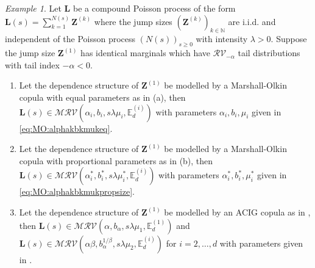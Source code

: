 \documentclass[aos]{imsart}
\numberwithin{equation}{section}
\theoremstyle{plain} %
\theoremstyle{remark}
\newtheorem{example}[theorem]{Example}
\newcommand{\E}{\mathbb{E}}
\newcommand{\N}{\mathbb{N}}
\def\MRV{\mathcal{MRV}}
\def\RV{\mathcal{RV}}
\def\bZ{\boldsymbol Z}
\def\bL{\boldsymbol L}
\begin{document}
\begin{example} \label{Example:5.2}
Let $\bL$ be a  compound Poisson process of the form $\bL(s)=\sum_{k=1}^{N(s)}\bZ^{(k)}$ where the jump sizes $(\bZ^{(k)})_{k\in\N}$ are i.i.d. and independent of the Poisson process $(N(s))_{s\geq 0}$ with intensity $\lambda>0$. 
Suppose the jump size $\bZ^{(1)}$ has identical marginals which have $\RV_{-\alpha}$ tail distributions with tail index $-\alpha<0$.
\begin{enumerate}
    \item[(a)]  Let the dependence structure of $\bZ^{(1)}$
    be modelled by a Marshall-Olkin copula with equal parameters as in (a), then
    $\bL(s)\in\MRV(\alpha_i,b_i,s\lambda \mu_i,\E_d^{(i)})$ with parameters  $\alpha_i, b_i, \mu_i$   given in \eqref{eq:MO:alphakbkmukeq}.
    \item[(b)] Let the dependence structure of $\bZ^{(1)}$
    be modelled by a Marshall-Olkin copula with proportional parameters
    as in (b), then $\bL(s)\in \MRV(\alpha_i^*,b_i^*,s\lambda\mu_i^*,\E_d^{(i)})$
    with parameters $\alpha_i^*, b_i^*, \mu_i^*$  given in \eqref{eq:MO:alphakbkmukpropsize}.
    \item[(c)]  Let the dependence structure of $\bZ^{(1)}$
    be modelled by an ACIG copula as in ,  then  $\bL(s)\in \MRV(\alpha,b_{\alpha},s\lambda\mu_1,\E_d^{(1)})$ and $\bL(s)\in\MRV(\alpha\beta,b_{\alpha}^{1/\beta},s\lambda\mu_2,\E_d^{(i)})$ for $i=2,\ldots, d$ with parameters  given in .
\end{enumerate}
\end{example}
\end{document}
